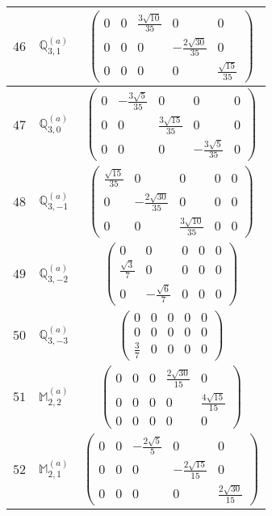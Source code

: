\documentclass[fleqn,8pt,landscape]{jsarticle}
\begin{document}
\begin{center}
\begin{longtable}{ccc}
$ 46 $ & $ \mathbb{Q}_{3,1}^{(a)} $ & $ \begin{pmatrix} 0 & 0 & \frac{3 \sqrt{10}}{35} & 0 & 0 \\ 0 & 0 & 0 & - \frac{2 \sqrt{30}}{35} & 0 \\ 0 & 0 & 0 & 0 & \frac{\sqrt{15}}{35} \end{pmatrix} $ \\ \hline
$ 47 $ & $ \mathbb{Q}_{3,0}^{(a)} $ & $ \begin{pmatrix} 0 & - \frac{3 \sqrt{5}}{35} & 0 & 0 & 0 \\ 0 & 0 & \frac{3 \sqrt{15}}{35} & 0 & 0 \\ 0 & 0 & 0 & - \frac{3 \sqrt{5}}{35} & 0 \end{pmatrix} $ \\ \hline
$ 48 $ & $ \mathbb{Q}_{3,-1}^{(a)} $ & $ \begin{pmatrix} \frac{\sqrt{15}}{35} & 0 & 0 & 0 & 0 \\ 0 & - \frac{2 \sqrt{30}}{35} & 0 & 0 & 0 \\ 0 & 0 & \frac{3 \sqrt{10}}{35} & 0 & 0 \end{pmatrix} $ \\ \hline
$ 49 $ & $ \mathbb{Q}_{3,-2}^{(a)} $ & $ \begin{pmatrix} 0 & 0 & 0 & 0 & 0 \\ \frac{\sqrt{3}}{7} & 0 & 0 & 0 & 0 \\ 0 & - \frac{\sqrt{6}}{7} & 0 & 0 & 0 \end{pmatrix} $ \\ \hline
$ 50 $ & $ \mathbb{Q}_{3,-3}^{(a)} $ & $ \begin{pmatrix} 0 & 0 & 0 & 0 & 0 \\ 0 & 0 & 0 & 0 & 0 \\ \frac{3}{7} & 0 & 0 & 0 & 0 \end{pmatrix} $ \\ \hline
$ 51 $ & $ \mathbb{M}_{2,2}^{(a)} $ & $ \begin{pmatrix} 0 & 0 & 0 & \frac{2 \sqrt{30}}{15} & 0 \\ 0 & 0 & 0 & 0 & \frac{4 \sqrt{15}}{15} \\ 0 & 0 & 0 & 0 & 0 \end{pmatrix} $ \\ \hline
$ 52 $ & $ \mathbb{M}_{2,1}^{(a)} $ & $ \begin{pmatrix} 0 & 0 & - \frac{2 \sqrt{5}}{5} & 0 & 0 \\ 0 & 0 & 0 & - \frac{2 \sqrt{15}}{15} & 0 \\ 0 & 0 & 0 & 0 & \frac{2 \sqrt{30}}{15} \end{pmatrix} $ \\ \hline

\end{longtable}
\end{center}
\end{document}
